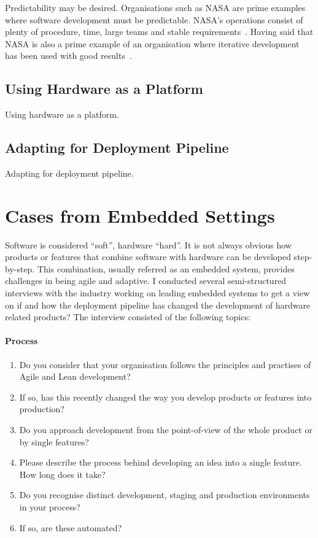 \documentclass[english]{tktltiki2}
\begin{document}
Predictability may be desired. Organisations such as NASA are prime examples where software development must be predictable. NASA’s operations consist of plenty of procedure, time, large teams and stable requirements~\cite{Fow05}. Having said that NASA is also a prime example of an organisation where iterative development has been used with good results~\cite{LB03}.

\subsection{Using Hardware as a Platform}

Using hardware as a platform.

\subsection{Adapting for Deployment Pipeline}

Adapting for deployment pipeline.


\section{Cases from Embedded Settings}

Software is considered “soft”, hardware “hard”. It is not always obvious how products or features that combine software with hardware can be developed step-by-step. This combination, usually referred as an embedded system, provides challenges in being agile and adaptive. I conducted several semi-structured interviews with the industry working on leading embedded systems to get a view on if and how the deployment pipeline has changed the development of hardware related products? The interview consisted of the following topics:

\paragraph{Process}

\begin{enumerate}

    \item Do you consider that your organisation follows the principles and practises of Agile and Lean development?
    \item If so, has this recently changed the way you develop products or features into production?
    \item Do you approach development from the point-of-view of the whole product or by single features?
    \item Please describe the process behind developing an idea into a single feature. How long does it take?
    \item Do you recognise distinct development, staging and production environments in your process?
    \item If so, are these automated?

\end{enumerate}
\end{document}
